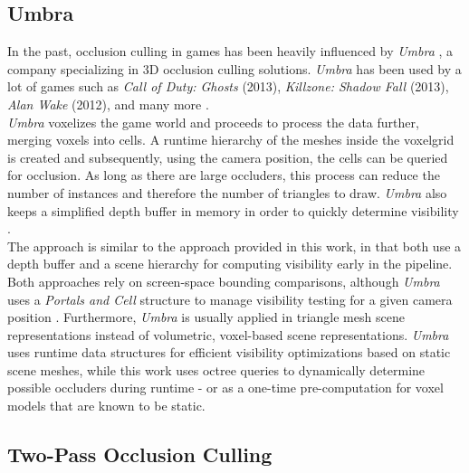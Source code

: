 \subsection*{Umbra}

In the past, occlusion culling in games has been heavily influenced by \emph{Umbra} \cite{Umbra2024}, a company 
specializing in 3D occlusion culling solutions. \emph{Umbra} has been used by a lot of games such as 
\emph{Call of Duty: Ghosts} (2013), \emph{Killzone: Shadow Fall} (2013), \emph{Alan Wake} (2012), and many more 
\cite{UmbraWiki,CallOfDutyGhostsCredits,KillzoneUmbra,AlanWakeUmbra}. \\

\noindent
\emph{Umbra} voxelizes the game world and proceeds to process the data further, merging voxels into cells. 
A runtime hierarchy of the meshes inside the voxelgrid is created and subsequently, using the camera position, 
the cells can be queried for occlusion. As long as there are large occluders, this process can reduce the number 
of instances and therefore the number of triangles to draw. \emph{Umbra} also keeps a simplified depth buffer in 
memory in order to quickly determine visibility \cite{Medium2018}. \\

\noindent 
The approach is similar to the approach provided  in this work, in that both use a depth buffer and a scene hierarchy 
for computing visibility early in the pipeline. Both approaches rely on screen-space bounding comparisons, although 
\emph{Umbra} uses a \emph{Portals and Cell} structure to manage visibility testing for a given camera position 
\cite{Medium2018}. Furthermore, \emph{Umbra} is usually applied in triangle mesh scene representations instead 
of volumetric, voxel-based scene representations. \emph{Umbra} uses runtime data structures for efficient visibility 
optimizations based on static scene meshes, while this work uses octree queries to dynamically determine possible 
occluders during runtime - or as a one-time pre-computation for voxel models that are known to be static. \\


\subsection*{Two-Pass Occlusion Culling}

